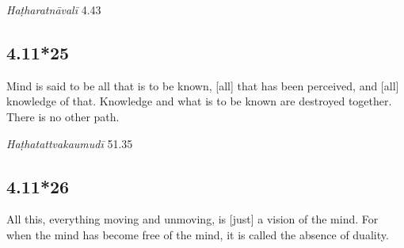 \begin{ekdosis}
\begin{testimonia}[hp04_011_24]
\emph{Haṭharatnāvalī} 4.43
\begin{versinnote}
\end{versinnote}
\end{testimonia}


\subsection*{4.11*25}
\begin{translation}[hp04_011_25]
Mind is said to be all that is to be known, [all] that has been perceived, and [all] knowledge of that. Knowledge and what is to be known are destroyed together. There is no other path.
\end{translation}


\begin{testimonia}[hp04_011_25]
\emph{Haṭhatattvakaumudī} 51.35
\begin{versinnote}
\end{versinnote}
\end{testimonia}


\subsection*{4.11*26}
\begin{translation}[hp04_011_26]
All this, everything moving and unmoving, is [just] a vision of the mind. For when the mind has become free of the mind, it is called the absence of duality.
\end{translation}


\end{ekdosis}
